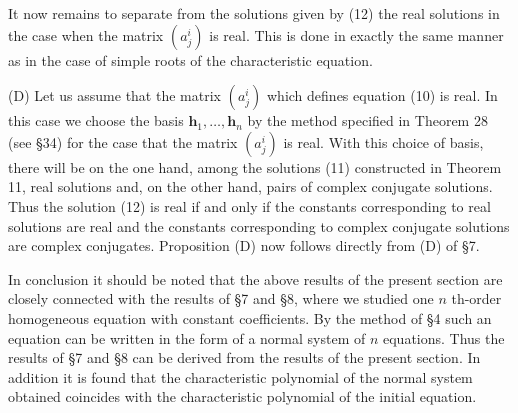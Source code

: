 \documentclass[10pt,a5paper]{book}
\theoremstyle{plain}
\theoremstyle{definition}
\theoremstyle{remark}
\begin{document}
It now remains to separate from the solutions given by (12) the real solutions in the case when the matrix $\left(a_{j}^{i}\right)$ is real. This is done in exactly the same manner as in the case of simple roots of the characteristic equation.

(D) Let us assume that the matrix $\left(a_{j}^{i}\right)$ which defines equation (10) is real. In this case we choose the basis $\mathbf{h}_{1}, \ldots, \mathbf{h}_{n}$ by the method specified in Theorem 28 (see §34) for the case that the matrix $\left(a_{j}^{i}\right)$ is real. With this choice of basis, there will be on the one hand, among the solutions (11) constructed in Theorem 11, real solutions and, on the other hand, pairs of complex conjugate solutions. Thus the solution (12) is real if and only if the constants corresponding to real solutions are real and the constants corresponding to complex conjugate solutions are complex conjugates. Proposition (D) now follows directly from (D) of §7.

In conclusion it should be noted that the above results of the present section are closely connected with the results of §7 and §8, where we studied one $n$ th-order homogeneous equation with constant coefficients. By the method of §4 such an equation can be written in the form of a normal system of $n$ equations. Thus the results of §7 and §8 can be derived from the results of the present section. In addition it is found that the characteristic polynomial of the normal system obtained coincides with the characteristic polynomial of the initial equation.
\end{document}
